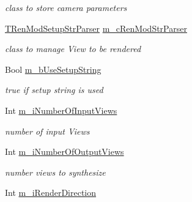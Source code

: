 \begin{DoxyCompactItemize}
\begin{DoxyCompactList}\small\item\em class to store camera parameters \end{DoxyCompactList}\item 
\mbox{\label{class_t_app_renderer_cfg_aa02852936217e68577fa295ec0d047de}} 
\hyperlink{class_t_ren_mod_setup_str_parser}{T\+Ren\+Mod\+Setup\+Str\+Parser} \hyperlink{class_t_app_renderer_cfg_aa02852936217e68577fa295ec0d047de}{m\+\_\+c\+Ren\+Mod\+Str\+Parser}
\begin{DoxyCompactList}\small\item\em class to manage View to be rendered \end{DoxyCompactList}\item 
\mbox{\label{class_t_app_renderer_cfg_a1766ad451611f3a52d9388f17e0bc053}} 
Bool \hyperlink{class_t_app_renderer_cfg_a1766ad451611f3a52d9388f17e0bc053}{m\+\_\+b\+Use\+Setup\+String}
\begin{DoxyCompactList}\small\item\em true if setup string is used \end{DoxyCompactList}\item 
\mbox{\label{class_t_app_renderer_cfg_a0c1487dc8df8c710f3297a585947809c}} 
Int \hyperlink{class_t_app_renderer_cfg_a0c1487dc8df8c710f3297a585947809c}{m\+\_\+i\+Number\+Of\+Input\+Views}
\begin{DoxyCompactList}\small\item\em number of input Views \end{DoxyCompactList}\item 
\mbox{\label{class_t_app_renderer_cfg_af9d471288464d2d606041d30bfa9c4c7}} 
Int \hyperlink{class_t_app_renderer_cfg_af9d471288464d2d606041d30bfa9c4c7}{m\+\_\+i\+Number\+Of\+Output\+Views}
\begin{DoxyCompactList}\small\item\em number views to synthesize \end{DoxyCompactList}\item 
\mbox{\label{class_t_app_renderer_cfg_abcddda4ed89155319e95b88182d9eeaa}} 
Int \hyperlink{class_t_app_renderer_cfg_abcddda4ed89155319e95b88182d9eeaa}{m\+\_\+i\+Render\+Direction}

\end{DoxyCompactItemize}
